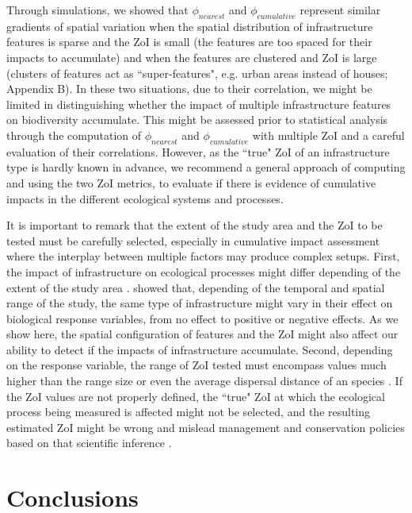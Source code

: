 \documentclass[titlepage]{article}
\begin{document}
Through simulations, we showed that $\phi_{nearest}$ and $\phi_{cumulative}$ represent similar gradients of spatial variation when the spatial distribution of infrastructure features is sparse and the ZoI is small (the features are too spaced for their impacts to accumulate) and when the features are clustered and ZoI is large (clusters of features act as ``super-features", e.g. urban areas instead of houses; Appendix B). In these two situations, due to their correlation, we might be limited in distinguishing whether the impact of multiple infrastructure features on biodiversity accumulate. This might be assessed prior to statistical analysis through the computation of $\phi_{nearest}$ and $\phi_{cumulative}$ with multiple ZoI and a careful evaluation of their correlations. However, as the ``true" ZoI of an infrastructure type is hardly known in advance, we recommend a general approach of computing and using the two ZoI metrics, to evaluate if there is evidence of cumulative impacts in the different ecological systems and processes.

It is important to remark that the extent of the study area and the ZoI to be tested must be carefully selected, especially in cumulative impact assessment where the interplay between multiple factors may produce complex setups. First, the impact of infrastructure on ecological processes might differ depending of the extent of the study area \citep{vistnes_matter_2008}. \citet{skarin_human_2014} showed that, depending of the temporal and spatial range of the study, the same type of infrastructure might vary in their effect on biological response variables, from no effect to positive or negative effects. As we show here, the spatial configuration of features and the ZoI might also affect our ability to detect if the impacts of infrastructure accumulate. 
Second, depending on the response variable, the range of ZoI tested must encompass values much higher than the range size or even the average dispersal distance of an species \citep{jackson_what_2012}. If the ZoI values are not properly defined, the ``true" ZoI at which the ecological process being measured is affected might not be selected, and the resulting estimated ZoI might be wrong and mislead management and conservation policies based on that scientific inference \citep[e.g.][]{jackson_are_2015}.

\section{Conclusions}
\end{document}
